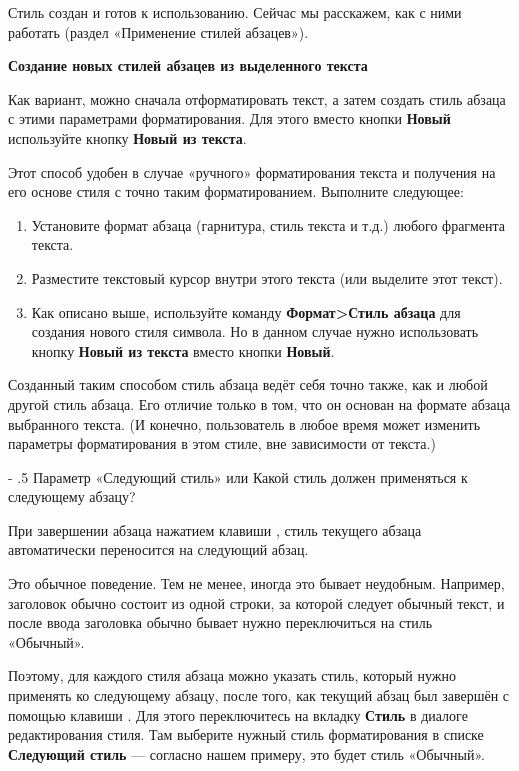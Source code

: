 ﻿\documentclass[a4paper,10pt]{article}
\makeatletter
\renewcommand\paragraph{%
   \@startsection{paragraph}{4}{0mm}%
      {-\baselineskip}%
      {.5\baselineskip}%
      {\normalfont\normalsize\bfseries}}
\makeatother
\begin{document}
Стиль создан и готов к использованию. Сейчас мы расскажем, как с ними работать (раздел «Применение стилей абзацев»).

\textbf{Создание новых стилей абзацев из выделенного текста}

Как вариант, можно сначала отформатировать текст, а затем создать стиль абзаца с этими параметрами форматирования. Для этого вместо кнопки \textbf{Новый} используйте кнопку \textbf{Новый из текста}.

Этот способ удобен в случае «ручного» форматирования текста и получения на его основе стиля с точно таким форматированием.
Выполните следующее:
\begin{enumerate}
 \item Установите формат абзаца (гарнитура, стиль текста и т.д.) любого фрагмента текста.
 \item Разместите текстовый курсор внутри этого текста (или выделите этот текст).
 \item Как описано выше, используйте команду \textbf{Формат>Стиль абзаца} для создания нового стиля символа. Но в данном случае нужно использовать кнопку \textbf{Новый из текста} вместо кнопки \textbf{Новый}.
\end{enumerate}

Созданный таким способом стиль абзаца ведёт себя точно также, как и любой другой стиль абзаца. Его отличие только в том, что он основан на формате абзаца выбранного текста. (И конечно, пользователь в любое время может изменить параметры форматирования в этом стиле, вне зависимости от текста.)

\paragraph{Параметр «Следующий стиль» или Какой стиль должен применяться к следующему абзацу?} 

При завершении абзаца нажатием клавиши , стиль текущего абзаца автоматически переносится на следующий абзац.

Это обычное поведение. Тем не менее, иногда это бывает неудобным. Например, заголовок обычно состоит из одной строки, за которой следует обычный текст, и после ввода заголовка обычно бывает нужно переключиться на стиль «Обычный».

Поэтому, для каждого стиля абзаца можно указать стиль, который нужно применять ко следующему абзацу, после того, как текущий абзац был завершён с помощью клавиши . Для этого переключитесь на вкладку \textbf{Стиль} в диалоге редактирования стиля. Там выберите нужный стиль форматирования в списке \textbf{Следующий стиль} — согласно нашем примеру, это будет стиль «Обычный».
\end{document}
